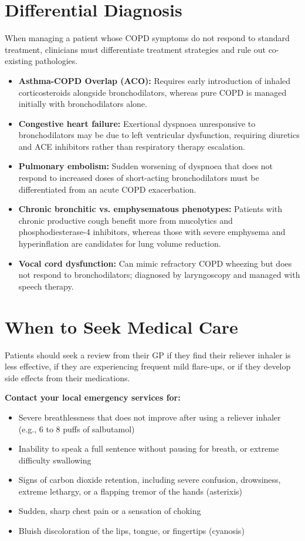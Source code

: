 \section*{Differential Diagnosis}
When managing a patient whose COPD symptoms do not respond to standard treatment, clinicians must differentiate treatment strategies and rule out co-existing pathologies.
\begin{itemize}
    \item \textbf{Asthma-COPD Overlap (ACO):} Requires early introduction of inhaled corticosteroids alongside bronchodilators, whereas pure COPD is managed initially with bronchodilators alone.
    \item \textbf{Congestive heart failure:} Exertional dyspnoea unresponsive to bronchodilators may be due to left ventricular dysfunction, requiring diuretics and ACE inhibitors rather than respiratory therapy escalation.
    \item \textbf{Pulmonary embolism:} Sudden worsening of dyspnoea that does not respond to increased doses of short-acting bronchodilators must be differentiated from an acute COPD exacerbation.
    \item \textbf{Chronic bronchitic vs. emphysematous phenotypes:} Patients with chronic productive cough benefit more from mucolytics and phosphodiesterase-4 inhibitors, whereas those with severe emphysema and hyperinflation are candidates for lung volume reduction.
    \item \textbf{Vocal cord dysfunction:} Can mimic refractory COPD wheezing but does not respond to bronchodilators; diagnosed by laryngoscopy and managed with speech therapy.
\end{itemize}

\section*{When to Seek Medical Care}
Patients should seek a review from their GP if they find their reliever inhaler is less effective, if they are experiencing frequent mild flare-ups, or if they develop side effects from their medications.

\textbf{Contact your local emergency services for:}
\begin{itemize}
    \item Severe breathlessness that does not improve after using a reliever inhaler (e.g., 6 to 8 puffs of salbutamol)
    \item Inability to speak a full sentence without pausing for breath, or extreme difficulty swallowing
    \item Signs of carbon dioxide retention, including severe confusion, drowsiness, extreme lethargy, or a flapping tremor of the hands (asterixis)
    \item Sudden, sharp chest pain or a sensation of choking
    \item Bluish discoloration of the lips, tongue, or fingertips (cyanosis)
\end{itemize}

